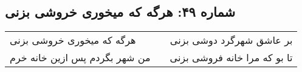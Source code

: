 \begin{center}
\section*{شماره ۴۹: هرگه که میخوری خروشی بزنی}
\label{sec:049}
\begin{longtable}{l p{0.5cm} r}
هرگه که میخوری خروشی بزنی
&&
بر عاشق شهرگرد دوشی بزنی
\\
من شهر بگردم پس ازین خانه خرم
&&
تا بو که مرا خانه فروشی بزنی
\\
\end{longtable}
\end{center}
